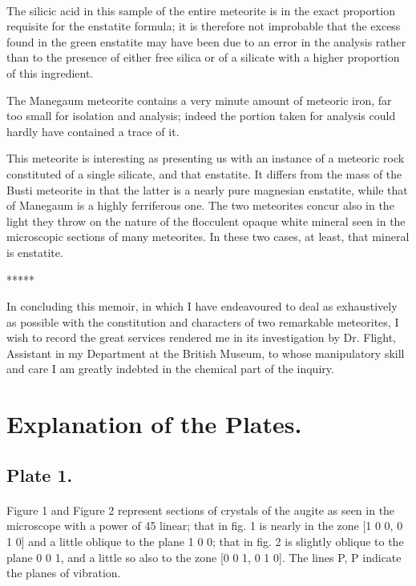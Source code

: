\documentclass[a4paper, 12pt, oneside]{article}
\begin{document}
\paragraph{}
The silicic acid in this sample of the entire meteorite is in the exact proportion requisite for the enstatite formula; it is therefore not improbable that the excess found in the green enstatite may have been due to an error in the analysis rather than to the presence of either free silica or of a silicate with a higher proportion of this ingredient.

The Manegaum meteorite contains a very minute amount of meteoric iron, far too small for isolation and analysis; indeed the portion taken for analysis could hardly have contained a trace of it.

This meteorite is interesting as presenting us with an instance of a meteoric rock constituted of a single silicate, and that enstatite. It differs from the mass of the Busti meteorite in that the latter is a nearly pure magnesian enstatite, while that of Manegaum is a highly ferriferous one. The two meteorites concur also in the light they throw on the nature of the flocculent opaque white mineral seen in the microscopic sections of many meteorites. In these two cases, at least, that mineral is enstatite.

\centerline{*\hspace{15mm}*\hspace{15mm}*\hspace{15mm}*\hspace{15mm}*}
\bigskip

In concluding this memoir, in which I have endeavoured to deal as exhaustively as possible with the constitution and characters of two remarkable meteorites, I wish to record the great services rendered me in its investigation by Dr. Flight, Assistant in my Department at the British Museum, to whose manipulatory skill and care I am greatly indebted in the chemical part of the inquiry.
\clearpage
\section{Explanation of the Plates.}
\subsection{Plate 1.}
\paragraph{}
Figure 1 and Figure 2 represent sections of crystals of the augite as seen in the microscope with a power of 45 linear; that in fig. 1 is nearly in the zone [1 0 0, 0 1 0] and a little oblique to the plane 1 0 0; that in fig. 2 is slightly oblique to the plane 0 0 1, and a little so also to the zone [0 0 1, 0 1 0]. The lines P, P indicate the planes of vibration.
\end{document}
